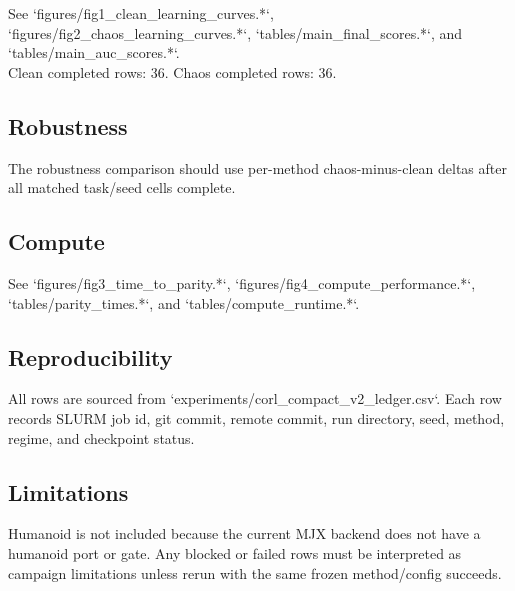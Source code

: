 \documentclass{article}
\begin{document}
See `figures/fig1\_clean\_learning\_curves.*`, `figures/fig2\_chaos\_learning\_curves.*`, `tables/main\_final\_scores.*`, and `tables/main\_auc\_scores.*`.\\

Clean completed rows: 36. Chaos completed rows: 36.\\

\subsection*{Robustness}

The robustness comparison should use per-method chaos-minus-clean deltas after all matched task/seed cells complete.\\

\subsection*{Compute}

See `figures/fig3\_time\_to\_parity.*`, `figures/fig4\_compute\_performance.*`, `tables/parity\_times.*`, and `tables/compute\_runtime.*`.\\

\subsection*{Reproducibility}

All rows are sourced from `experiments/corl\_compact\_v2\_ledger.csv`. Each row records SLURM job id, git commit, remote commit, run directory, seed, method, regime, and checkpoint status.\\

\subsection*{Limitations}

Humanoid is not included because the current MJX backend does not have a humanoid port or gate. Any blocked or failed rows must be interpreted as campaign limitations unless rerun with the same frozen method/config succeeds.\\
\end{document}
